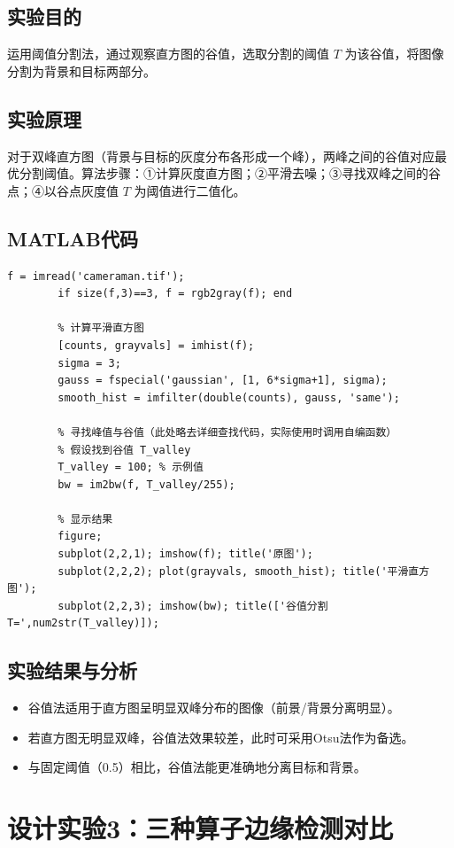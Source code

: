 \documentclass[12pt,a4paper]{article}
\begin{document}
	\subsection{实验目的}
	运用阈值分割法，通过观察直方图的谷值，选取分割的阈值 \(T\) 为该谷值，将图像分割为背景和目标两部分。
	
	\subsection{实验原理}
	对于双峰直方图（背景与目标的灰度分布各形成一个峰），两峰之间的谷值对应最优分割阈值。算法步骤：①计算灰度直方图；②平滑去噪；③寻找双峰之间的谷点；④以谷点灰度值 \(T\) 为阈值进行二值化。
	
	\subsection{MATLAB代码}
	\begin{lstlisting}[caption=直方图谷值阈值分割]
		f = imread('cameraman.tif');
		if size(f,3)==3, f = rgb2gray(f); end
		
		% 计算平滑直方图
		[counts, grayvals] = imhist(f);
		sigma = 3;
		gauss = fspecial('gaussian', [1, 6*sigma+1], sigma);
		smooth_hist = imfilter(double(counts), gauss, 'same');
		
		% 寻找峰值与谷值（此处略去详细查找代码，实际使用时调用自编函数）
		% 假设找到谷值 T_valley
		T_valley = 100; % 示例值
		bw = im2bw(f, T_valley/255);
		
		% 显示结果
		figure;
		subplot(2,2,1); imshow(f); title('原图');
		subplot(2,2,2); plot(grayvals, smooth_hist); title('平滑直方图');
		subplot(2,2,3); imshow(bw); title(['谷值分割 T=',num2str(T_valley)]);
	\end{lstlisting}
	
	\subsection{实验结果与分析}
	\begin{itemize}
		\item 谷值法适用于直方图呈明显双峰分布的图像（前景/背景分离明显）。
		\item 若直方图无明显双峰，谷值法效果较差，此时可采用Otsu法作为备选。
		\item 与固定阈值（0.5）相比，谷值法能更准确地分离目标和背景。
	\end{itemize}
	
	\section{设计实验3：三种算子边缘检测对比}
	
\end{document}
